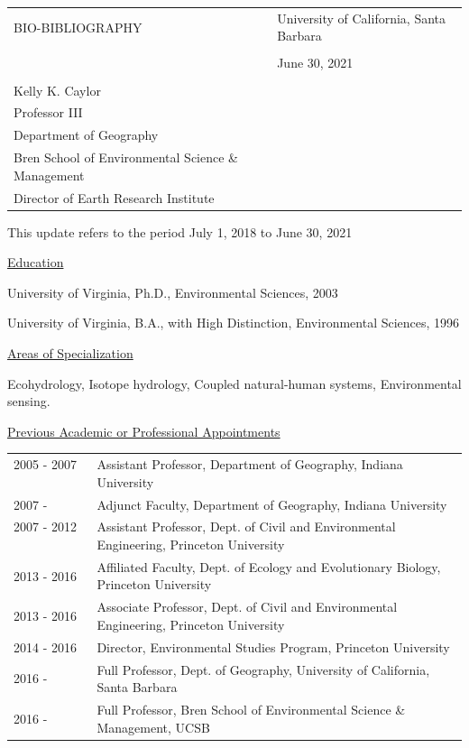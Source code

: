 \documentclass[10pt]{article}
\begin{document}
\noindent
\begin{tabularx}{\linewidth}{XX} 
BIO-BIBLIOGRAPHY & \hfill University of California, Santa Barbara \\ \\
 & \hfill June 30, 2021 \\ \\
 Kelly K. Caylor &   \\ 
 Professor III & \\
 Department of Geography & \\
 Bren School of Environmental Science \& Management & \\
 Director of Earth Research Institute & 
 \end{tabularx}

\vspace{1cm}

This update refers to the period July 1, 2018 to June 30, 2021


\vspace{1cm}

\raggedright

\vspace{0.5cm}
\underline{Education}

University of Virginia, Ph.D., Environmental Sciences, 2003

University of Virginia, B.A., with High Distinction, Environmental Sciences, 1996

\vspace{0.5cm}
\underline{Areas of Specialization}

Ecohydrology, Isotope hydrology, Coupled natural-human systems, Environmental sensing.

\vspace{0.5cm}
\underline{Previous Academic or Professional Appointments}
\begin{tabular}{l p{5.5in} }

2005 - 2007 \ \ \ \  & Assistant Professor, Department of Geography, Indiana University \\
2007 - \ \ \ \ & Adjunct Faculty, Department of Geography, Indiana University \\ 
2007 - 2012 \ \ \ \ & Assistant Professor, Dept. of Civil and Environmental Engineering, Princeton University \\
2013 - 2016 & Affiliated Faculty, Dept. of Ecology and Evolutionary Biology, Princeton University \\
2013 - 2016 & Associate Professor, Dept. of Civil and Environmental Engineering, Princeton University \\
2014 - 2016 & Director, Environmental Studies Program, Princeton University \\
2016 - \ \ \ \ & Full Professor, Dept. of Geography, University of California, Santa Barbara \\ 
2016 - \ \ \ \ & Full Professor, Bren School of Environmental Science \& Management, UCSB \\ 

\end{tabular}
\end{document}
